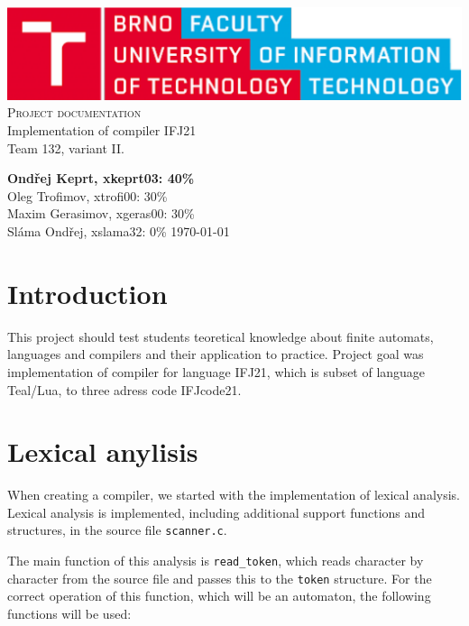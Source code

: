\documentclass[11pt]{article}
\begin{document}
	\begin{titlepage}
		\begin{center}
		\includegraphics[width=0.77\linewidth]{fitlogo.eps} \\

        \textsc{\Huge Project documentation}\\
        \LARGE
            Implementation of compiler IFJ21    \\
            Team 132, variant II.
    \end{center}

    \noindent\textbf{Ondřej Keprt, xkeprt03: 40\%}\\
    Oleg Trofimov, xtrofi00: 30\%    \\
    Maxim Gerasimov, xgeras00: 30\%  \\
    Sláma Ondřej, xslama32: 0\%   \hfill    \today

\end{titlepage}

\newpage
\tableofcontents
\thispagestyle{empty}
\newpage
\setcounter{page}{1}


\section*{Introduction}
This project should test students teoretical knowledge about finite automats, languages and compilers and their application to practice. Project goal was implementation of compiler
for language IFJ21, which is subset of language Teal/Lua, to three adress code IFJcode21.

\section{Lexical anylisis}
When creating a compiler, we started with the implementation of lexical analysis. Lexical analysis is implemented, including additional support functions and structures, in the source file \texttt{scanner.c}. 

The main function of this analysis is \texttt {read\_token}, which reads character by character from the source file and passes this to the \texttt{token} structure. For the correct operation of this function, which will be an automaton, the following functions will be used:
    
\end{document}
